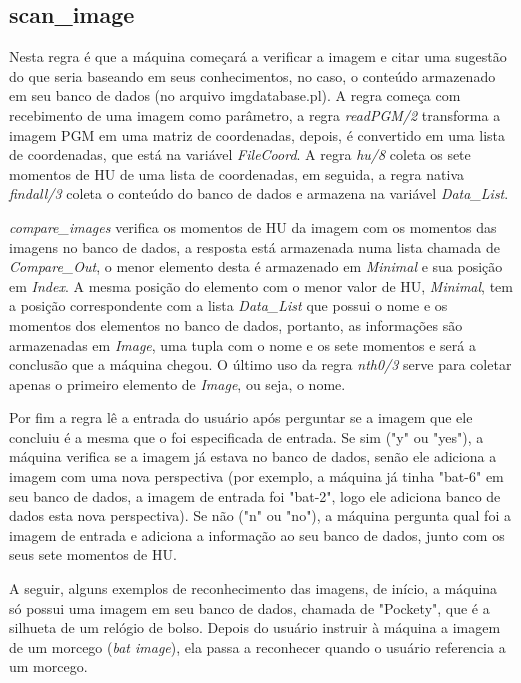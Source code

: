 \documentclass{article}
\begin{document}
    \subsection*{scan\_image}
        Nesta regra é que a máquina começará a verificar a imagem e citar uma sugestão do que seria baseando em seus conhecimentos, no caso, o conteúdo armazenado em seu banco de dados (no arquivo imgdatabase.pl). A regra começa com recebimento de uma imagem como parâmetro, a regra \textit{readPGM/2} transforma a imagem PGM em uma matriz de coordenadas, depois, é convertido em uma lista de coordenadas, que está na variável \textit{FileCoord}. A regra \textit{hu/8} coleta os sete momentos de HU de uma lista de coordenadas, em seguida, a regra nativa \textit{findall/3} coleta o conteúdo do banco de dados e armazena na variável \textit{Data\_List}.
        
        \textit{compare\_images} verifica os momentos de HU da imagem com os momentos das imagens no banco de dados, a resposta está armazenada numa lista chamada de \textit{Compare\_Out}, o menor elemento desta é armazenado em \textit{Minimal} e sua posição em \textit{Index}. A mesma posição do elemento com o menor valor de HU, \textit{Minimal}, tem a posição correspondente com a lista \textit{Data\_List} que possui o nome e os momentos dos elementos no banco de dados, portanto, as informações são armazenadas em \textit{Image}, uma tupla com o nome e os sete momentos e será a conclusão que a máquina chegou. O último uso da regra \textit{nth0/3} serve para coletar apenas o primeiro elemento de \textit{Image}, ou seja, o nome.
        
        Por fim a regra lê a entrada do usuário após perguntar se a imagem que ele concluiu é a mesma que o foi especificada de entrada. Se sim ("y" ou "yes"), a máquina verifica se a imagem já estava no banco de dados, senão ele adiciona a imagem com uma nova perspectiva (por exemplo, a máquina já tinha "bat-6" em seu banco de dados, a imagem de entrada foi "bat-2", logo ele adiciona banco de dados esta nova perspectiva). Se não ("n" ou "no"), a máquina pergunta qual foi a imagem de entrada e adiciona a informação ao seu banco de dados, junto com os seus sete momentos de HU.
        
        A seguir, alguns exemplos de reconhecimento das imagens, de início, a máquina só possui uma imagem em seu banco de dados, chamada de "Pockety", que é a silhueta de um relógio de bolso. Depois do usuário instruir à máquina a imagem de um morcego (\textit{bat image}), ela passa a reconhecer quando o usuário referencia a um morcego.
        
\end{document}
